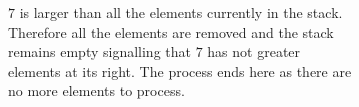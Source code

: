 \begin{figure}
\begin{subfigure}[t]{0.49\textwidth}
\begin{framed}
		\end{framed}
		\caption{$7$ is larger than all the elements currently in the stack. Therefore all the elements are removed and the stack remains empty signalling that $7$ has not greater elements at its right. The process ends here as there are no more elements to process.}
		\label{fig:next_greater:variation1:stack7}
	 \end{subfigure}
	 \caption[]{}
	  \label{fig:next_greater:stack}
\end{figure}